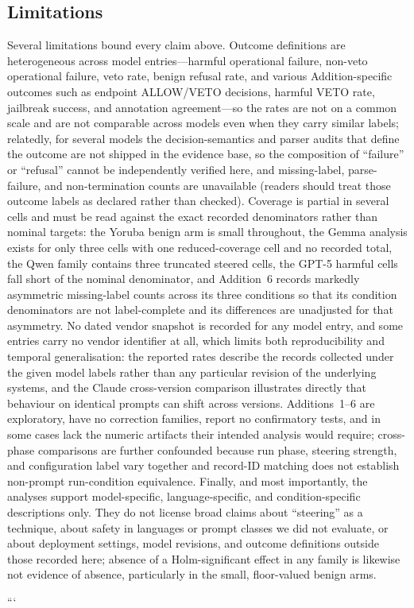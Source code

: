\subsection{Limitations}

Several limitations bound every claim above. Outcome definitions are
heterogeneous across model entries---harmful operational failure, non-veto
operational failure, veto rate, benign refusal rate, and various
Addition-specific outcomes such as endpoint ALLOW/VETO decisions, harmful VETO
rate, jailbreak success, and annotation agreement---so the rates are not on a
common scale and are not comparable across models even when they carry similar
labels; relatedly, for several models the decision-semantics and parser audits
that define the outcome are not shipped in the evidence base, so the composition
of ``failure'' or ``refusal'' cannot be independently verified here, and
missing-label, parse-failure, and non-termination counts are unavailable
(readers should treat those outcome labels as declared rather than checked).
Coverage is partial in several cells and must be read against the exact recorded
denominators rather than nominal targets: the Yoruba benign arm is small
throughout, the Gemma analysis exists for only three cells with one
reduced-coverage cell and no recorded total, the Qwen family contains three
truncated steered cells, the GPT-5 harmful cells fall short of the nominal
denominator, and Addition~6 records markedly asymmetric missing-label counts
across its three conditions so that its condition denominators are not
label-complete and its differences are unadjusted for that asymmetry. No dated
vendor snapshot is recorded for any model entry, and some entries carry no vendor
identifier at all, which limits both reproducibility and temporal
generalisation: the reported rates describe the records collected under the given
model labels rather than any particular revision of the underlying systems, and
the Claude cross-version comparison illustrates directly that behaviour on
identical prompts can shift across versions. Additions~1--6 are exploratory, have
no correction families, report no confirmatory tests, and in some cases lack the
numeric artifacts their intended analysis would require; cross-phase comparisons
are further confounded because run phase, steering strength, and configuration
label vary together and record-ID matching does not establish non-prompt
run-condition equivalence. Finally, and most importantly, the analyses support
model-specific, language-specific, and condition-specific descriptions only. They
do not license broad claims about ``steering'' as a technique, about safety in
languages or prompt classes we did not evaluate, or about deployment settings,
model revisions, and outcome definitions outside those recorded here; absence of
a Holm-significant effect in any family is likewise not evidence of absence,
particularly in the small, floor-valued benign arms.

```
